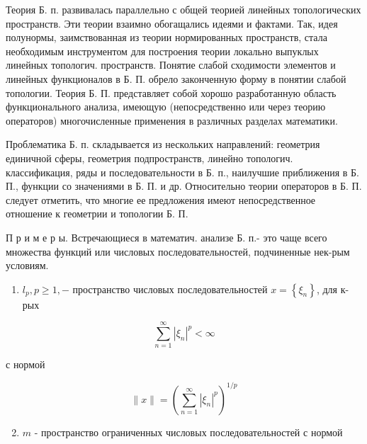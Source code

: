 \documentclass[10pt]{article}
\begin{document}
Теория Б. п. развивалась параллельно с общей теорией линейных топологических пространств. Эти теории взаимно обогащались идеями и фактами. Так, идея полунормы, заимствованная из теории нормированных пространств, стала необходимым инструментом для построения теории локально выпуклых линейных топологич. пространств. Понятие слабой сходимости элементов и линейных функционалов в Б. П. обрело законченную форму в понятии слабой топологии. Теория Б. П. представляет собой хорошо разработанную область функционального анализа, имеющую (непосредственно или через теорию операторов) многочисленные применения в различных разделах математики.



Проблематика Б. п. складывается из нескольких направлений: геометрия единичной сферы, геометрия подпространств, линейно топологич. классификация, ряды и последовательности в Б. п., наилучшие приближения в Б. П., функции со значениями в Б. П. и др. Относительно теории операторов в Б. П. следует отметить, что многие ее предложения имеют непосредственное отношение к геометрии и топологии Б. П.



П р и м е р ы. Встречающиеся в математич. анализе Б. п.- это чаще всего множества функций или числовых последовательностей, подчиненные нек-рым условиям.



\begin{enumerate}

  \item $l_{p}, p \geqslant 1,-$ пространство числовых последовательностей $x=\left\{\xi_{n}\right\}$, для к-рых

\end{enumerate}



\[

\sum_{n=1}^{\infty}\left|\xi_{n}\right|^{p}<\infty

\]



с нормой



\[

\|x\|=\left(\sum_{n=1}^{\infty}\left|\xi_{n}\right|^{p}\right)^{1 / p}

\]



\begin{enumerate}

  \setcounter{enumi}{1}

  \item $m$ - пространство ограниченных числовых последовательностей с нормой

\end{enumerate}
\end{document}
